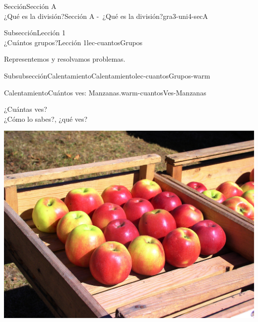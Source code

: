 \begin{sectionptx}{Sección}{{\Large Sección A\\}¿Qué es la división?}{}{Sección A -~¿Qué es la división?}{}{}{gra3-uni4-secA}
%
%
\typeout{************************************************}
\typeout{************************************************}
%
\begin{subsectionptx}{Subsección}{{\normalsize Lección 1\\[-0.05cm]}¿Cuántos grupos?}{}{Lección 1}{}{}{lec-cuantosGrupos}
\begin{introduction}{}%
Representemos y resolvamos problemas.%
\end{introduction}%
%
%
\typeout{************************************************}
\typeout{************************************************}
%
\begin{subsubsectionptx}{Subsubsección}{Calentamiento}{}{Calentamiento}{}{}{lec-cuantosGrupos-warm}
\begin{exploration}{Calentamiento}{Cuántos ves: Manzanas.}{warm-cuantosVes-Manzanas}%
\begin{sidebyside}{2}{0.0}{0.0}{0.05}%
\begin{sbspanel}{0.4}%
¿Cuántas ves?\\
 ¿Cómo lo sabes?, ¿qué ves?%
\end{sbspanel}%
\begin{sbspanel}{0.55}%
\begin{image}{0}{1}{0}{}%
\includegraphics[max width=\linewidth, center]{external/jpg-source/apples-1642732_1920.jpg}

\end{image}
\end{sbspanel}
\end{sidebyside}
\end{exploration}
\end{subsubsectionptx}
\end{subsectionptx}
\end{sectionptx}
